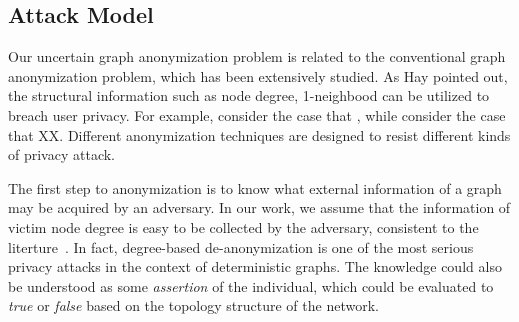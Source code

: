 \subsection{Attack Model}
Our uncertain graph anonymization problem is related to the conventional graph anonymization problem, which has been extensively studied. As Hay {\etal} pointed out, the structural information such as node degree, 1-neighbood can be utilized to breach user privacy. For example, \cite{} consider the case that , while \cite{} consider the case that XX. Different anonymization techniques are designed to resist different kinds of privacy attack.

The first step to anonymization is to know what external information of a graph may be acquired by an adversary. In our work, we assume that the information of victim node degree is easy to be collected by the adversary, consistent to the literture~\cite{}.  In fact, degree-based de-anonymization is one of the most serious privacy attacks in the context of deterministic graphs. The knowledge  could also be understood as some \emph{assertion} of the individual, which could be evaluated to \emph{true} or \emph{false} based on the topology structure of the network. 

